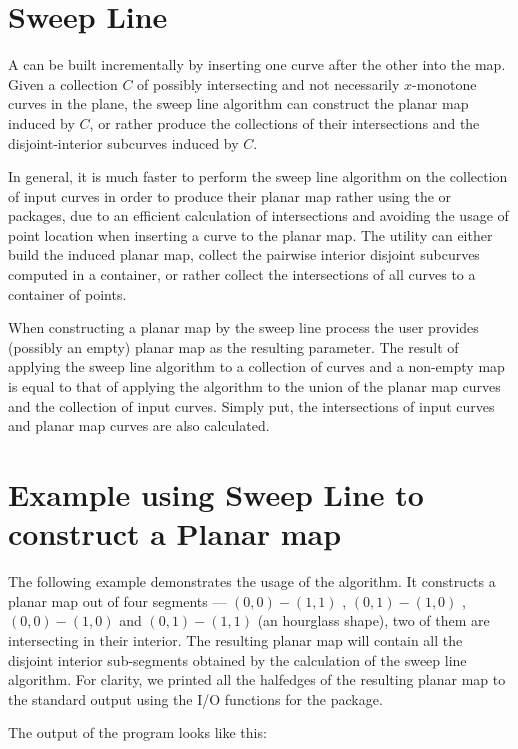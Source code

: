 \section{Sweep Line}

A  can be built incrementally by
inserting one curve after the other into the map. 
Given a collection $C$ of possibly intersecting and not necessarily 
$x$-monotone curves in the plane, the sweep line algorithm can construct 
the planar map induced by $C$, or rather produce the collections of their 
intersections and the disjoint-interior subcurves induced by $C$.
 
In general, it is much faster to perform the sweep line algorithm on
the collection of input curves in order to produce their planar map 
rather using the  
or  packages, due to an 
efficient calculation of intersections and avoiding the usage of 
point location when inserting a curve to the planar map. 
The utility can either build the induced planar
map, collect the pairwise interior disjoint subcurves
computed in a container, or rather collect the intersections of all 
curves to a container of points. 

When constructing a planar map by the sweep line process the user 
provides (possibly an empty) planar map as the resulting parameter. 
The result of applying the sweep line algorithm to a 
collection of curves and a non-empty map is equal to that 
of applying the algorithm to the union of the
planar map curves and the collection of input curves. Simply put,
the intersections of input curves and planar map curves are also
calculated.

\section{Example using Sweep Line to construct a Planar map}
\label{ssec:example1_sweep}
The following example demonstrates the usage of the 
 algorithm. 
It constructs a planar map out of four segments
--- $(0,0)-(1,1)$ , $(0,1)-(1,0)$ , $(0,0)-(1,0)$ and $(0,1)-(1,1)$
(an hourglass shape), two of them are intersecting in their
interior. The resulting planar map will contain all the disjoint
interior sub-segments obtained by the calculation of the sweep
line algorithm. For clarity, we printed all the halfedges of the
resulting planar map to the standard output using the I/O functions
for the  package.


The output of the program looks like this:




